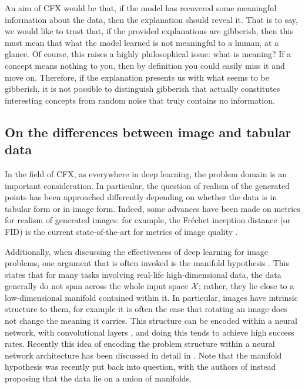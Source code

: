 \documentclass[../main.tex]{subfiles}
\begin{document}

An aim of CFX would be that, if the model has recovered some meaningful information about the data, then the explanation should reveal it. That is to say, we would like to trust that, if the provided explanations are gibberish, then this must mean that what the model learned is not meaningful to a human, at a glance.
Of course, this raises a highly philosophical issue: what is meaning? 
If a concept means nothing to you, then by definition you could easily miss it and move on.
Therefore, if the explanation presents us with what seems to be gibberish, it is not possible to distinguish gibberish that actually constitutes interesting concepts from random noise that truly contains no information.

\subsection{On the differences between image and tabular data}
\label{intro/image_data}

In the field of CFX, as everywhere in deep learning, the problem domain is an important consideration.
In particular, the question of realism of the generated points has been approached differently depending on whether the data is in tabular form or in image form.
Indeed, some advances have been made on metrics for realism of generated images: for example, the Fréchet inception distance (or FID) is the current state-of-the-art for metrics of image quality \cite{heuselGANs2017}.


Additionally, when discussing the effectiveness of deep learning for image problems, one argument that is often invoked is the manifold hypothesis \cite{bengioRepresentation2013}.
This states that for many tasks involving real-life high-dimensional data, the data generally do not span across the whole input space $\mathcal{X}$; rather, they lie close to a low-dimensional manifold contained within it.
In particular, images have intrinsic structure to them, for example it is often the case that rotating an image does not change the meaning it carries.
This structure can be encoded within a neural network, \eg{} with convolutional layers \cite{zhangShiftinvariant1988, lecunBackpropagation1989}, and doing this tends to achieve high success rates.
Recently this idea of encoding the problem structure within a neural network architecture has been discussed in detail in \cite{bronsteinGeometric2021}.
Note that the manifold hypothesis was recently put back into question, with the authors of \cite{brownUnion2022} instead proposing that the data lie on a union of manifolds.
\end{document}
